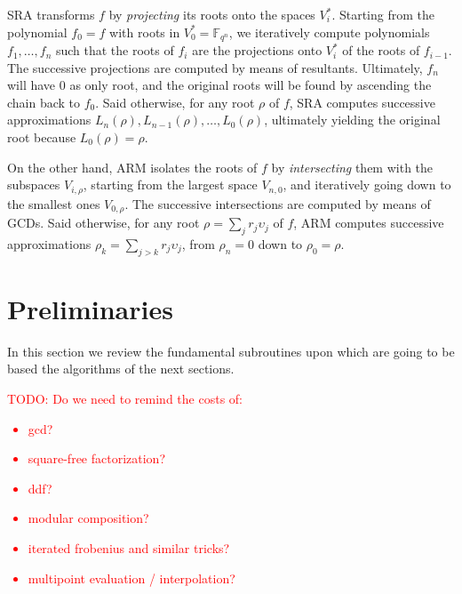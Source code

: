 \documentclass{sig-alternate}
\newcommand{\ff}[1]{\mathbb{F}_{#1}}
\newcommand{\qq}{q}
\newcommand{\nn}{n}
\newcommand{\qn}{{\qq^\nn}}
\newcommand{\extf}{\ff{\qn}}
\newcounter{algo}
\newcommand{\todo}[1]{\textcolor{red}{TODO: #1}}
\begin{document}
SRA transforms $f$ by \emph{projecting} its roots onto the spaces
$V_i^\ast$.  Starting from the polynomial $f_0=f$ with roots in
$V_0^\ast=\extf$, we iteratively compute polynomials $f_1,\dots,f_n$
such that the roots of $f_i$ are the projections onto $V_i^\ast$ of
the roots of $f_{i-1}$.  The successive projections are computed by
means of resultants.  Ultimately, $f_n$ will have $0$ as only root,
and the original roots will be found by ascending the chain back to
$f_0$.  Said otherwise, for any root $\rho$ of $f$, SRA computes
successive approximations $L_n(\rho),L_{n-1}(\rho),\dots,L_0(\rho)$,
ultimately yielding the original root because $L_0(\rho)=\rho$.

On the other hand, ARM isolates the roots of $f$ by
\emph{intersecting} them with the subspaces $V_{i,\rho}$, starting
from the largest space $V_{n,0}$, and iteratively going down to the
smallest ones $V_{0,\rho}$.  The successive intersections are computed
by means of GCDs.  Said otherwise, for any root $\rho=\sum_j
r_j\upsilon_j$ of $f$, ARM computes successive approximations
$\rho_k=\sum_{j>k}r_j\upsilon_j$, from $\rho_n=0$ down to
$\rho_0=\rho$.


\section{Preliminaries}

In this section we review the fundamental subroutines upon which are
going to be based the algorithms of the next sections.

\todo{Do we need to remind the costs of:
  \begin{itemize}
  \item gcd?
  \item square-free factorization?
  \item ddf?
  \item modular composition?
  \item iterated frobenius and similar tricks?
  \item multipoint evaluation / interpolation?
  \end{itemize}
}
\end{document}

